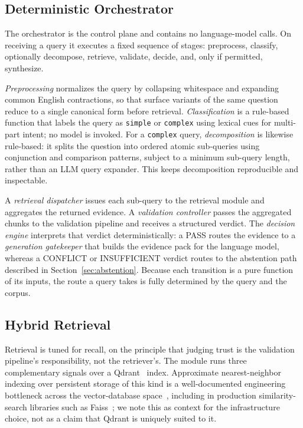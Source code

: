 \documentclass[conference]{IEEEtran}
\begin{document}
\subsection{Deterministic Orchestrator}
\label{sec:orchestrator}
The orchestrator is the control plane and contains no language-model calls.
On receiving a query it executes a fixed sequence of stages:
preprocess, classify, optionally decompose, retrieve, validate, decide,
and, only if permitted, synthesize.

\textit{Preprocessing} normalizes the query by collapsing whitespace and
expanding common English contractions, so that surface variants of the
same question reduce to a single canonical form before retrieval.
\textit{Classification} is a rule-based function that labels the query as
\texttt{simple} or \texttt{complex} using lexical cues for multi-part
intent; no model is invoked. For a \texttt{complex} query,
\textit{decomposition} is likewise rule-based: it splits the question into
ordered atomic sub-queries using conjunction and comparison patterns,
subject to a minimum sub-query length, rather than an LLM query expander.
This keeps decomposition reproducible and inspectable.

A \textit{retrieval dispatcher} issues each sub-query to the retrieval
module and aggregates the returned evidence. A \textit{validation
controller} passes the aggregated chunks to the validation pipeline and
receives a structured verdict. The \textit{decision engine} interprets
that verdict deterministically: a PASS routes the evidence to a
\textit{generation gatekeeper} that builds the evidence pack for the
language model, whereas a CONFLICT or INSUFFICIENT verdict routes to the
abstention path described in Section~\ref{sec:abstention}. Because each
transition is a pure function of its inputs, the route a query takes is
fully determined by the query and the corpus.

\subsection{Hybrid Retrieval}
\label{sec:retrieval}
Retrieval is tuned for recall, on the principle that judging trust is the
validation pipeline's responsibility, not the retriever's. The module runs
three complementary signals over a Qdrant~\cite{qdrant} index. Approximate
nearest-neighbor indexing over persistent storage of this kind is a
well-documented engineering bottleneck across the vector-database
space~\cite{jing2024vdbmssurvey}, including in production similarity-search
libraries such as Faiss~\cite{douze2025faisslibrary}; we note this as context for
the infrastructure choice, not as a claim that Qdrant is uniquely suited to
it.
\end{document}
